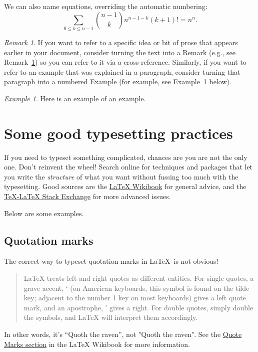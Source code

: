 \documentclass[11pt]{amsart}
\theoremstyle{definition}                  %
\theoremstyle{remark}                       %
\newtheorem{exmp}[thm]{Example}
\newtheorem{rem}[thm]{Remark}
\numberwithin{equation}{section}
\begin{document}
We can also name equations, overriding the automatic numbering: 
\begin{equation}
\sum_{0 \leq k \leq n-1}  \binom{n-1}{k}  n^{n-1-k} (k+1)! = n^n \tag{Key Eq.}.
\end{equation}

\begin{rem} \label{rmk:rmk}
If you want to refer to a specific idea or bit of prose that appears earlier in your document, consider turning the text into a Remark (e.g., see Remark~\ref{rmk:rmk}) so you can refer to it via a cross-reference. 
Similarly, if you want to refer to an example that was explained in a paragraph, consider turning that paragraph into a numbered Example (for example, see Example~\ref{ex:example-of-an-example} below).
\end{rem}

\begin{exmp}
Here is an example of an example. \label{ex:example-of-an-example}
\end{exmp}

\section{Some good typesetting practices}

If you need to typeset something complicated, chances are you are not the only one. Don't reinvent the wheel! 
Search online for techniques and packages  that let you write the \emph{structure} of what you want without fussing too much with the typesetting. 
Good sources are the \href{https://en.wikibooks.org/wiki/LaTeX}{LaTeX Wikibook} \cite{wikibook} for general advice, and the \href{https://tex.stackexchange.com/}{TeX-LaTeX Stack Exchange} for more advanced issues. 

Below are some examples. 

\subsection{Quotation marks}
The correct way to typeset quotation marks in \LaTeX\ is not obvious!
\begin{quotation}
LaTeX treats left and right quotes as different entities. For single quotes, a grave accent, ` (on American keyboards, this symbol is found on the tilde key; adjacent to the number 1 key on most keyboards) gives a left quote mark, and an apostrophe, ' gives a right. For double quotes, simply double the symbols, and LaTeX will interpret them accordingly. \cite[Chap. ``LaTeX/Text Formatting'', \S 3]{wikibook}
\end{quotation}
In other words, it's ``Quoth the raven'', not "Quoth the raven".  See the \href{https://en.wikibooks.org/wiki/LaTeX/Text_Formatting#Quote-marks}{Quote Marks section} in the LaTeX Wikibook \cite{wikibook} for more information.
\end{document}
